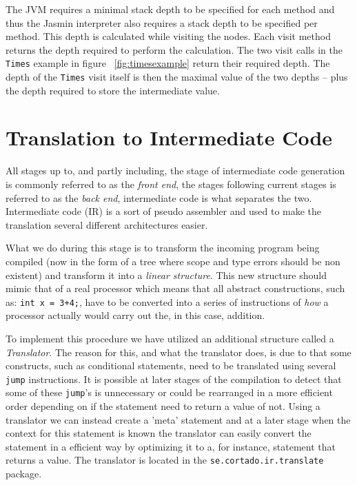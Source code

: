 \documentclass[11pt]{amsart}
\begin{document}
The JVM requires a minimal stack depth to be specified for each method and thus the Jasmin interpreter also requires a stack depth to be specified per method. This depth is calculated while visiting the nodes. Each visit method returns the depth required to perform the calculation. The two visit calls in the \texttt{Times} example in figure ~\ref{fig:timesexample} return their required depth. The depth of the \texttt{Times} visit itself is then the maximal value of the two depths -- plus the depth required to store the intermediate value. 

\section{Translation to Intermediate Code}
All stages up to, and partly including, the stage of intermediate code generation is commonly referred to as the \textit{front end}, the stages following current stages is referred to as the \textit{back end}, intermediate code is what separates the two. Intermediate code (IR) is a sort of pseudo assembler and used to make the translation several different architectures easier. 

What we do during this stage is to transform the incoming program being compiled (now in the form of a tree where scope and type errors should be non existent) and transform it into a \textit{linear structure}. This new structure should mimic that of a real processor which means that all abstract constructions, such as: \texttt{int x = 3+4;}, have to be converted into a series of instructions of \textit{how} a processor actually would carry out the, in this case, addition.

To implement this procedure we have utilized an additional structure called a \textit{Translator}. The reason for this, and what the translator does, is due to that some constructs, such as conditional statements, need to be translated using several \texttt{jump} instructions. It is possible at later stages of the compilation to detect that some of these \texttt{jump}'s is unnecessary or could be rearranged in a more efficient order depending on if the statement need to return a value of not. Using a translator we can instead create a 'meta' statement and at a later stage when the context for this statement is known the translator can easily convert the statement in a efficient way by optimizing it to a, for instance, statement that returns a value. The translator is located in the \texttt{se.cortado.ir.translate} package.
\end{document}
